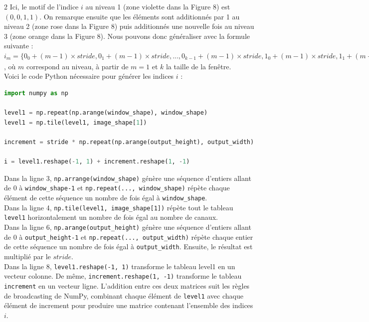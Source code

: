 \begin{multicols}{2}
Ici, le motif de l’indice $i$ au niveau 1 (zone violette dans la Figure 8) est $ (0,0,1,1) $. 
On remarque ensuite que les éléments sont additionnés par 1 au niveau 2 (zone rose dans la Figure 8) 
puis additionnés une nouvelle fois au niveau 3 (zone orange dans la Figure 8). Nous pouvons donc généraliser 
avec la formule suivante : \\

$ i_{m} = \{0_{0}+(m-1)\times stride,0_{1}+(m-1)\times stride,...,0_{k-1}+(m-1)\times stride, 1_{0}+(m-1)\times stride,1_{1}+(m-1)\times stride,...,1_{k-1}+(m-1)\times stride, (k-1)_{0}+(m-1)\times stride, (k-1)_{1}+(m-1)\times stride,..., (k-1)_{k-1}+(m-1)\times stride \}$,
où $m$ correspond au niveau, à partir de $m=1$ et $k$ la taille de la fenêtre. \\

Voici le code Python nécessaire pour générer les indices $i$ : \\

\begin{lstlisting}[language=Python]
import numpy as np

level1 = np.repeat(np.arange(window_shape), window_shape)
level1 = np.tile(level1, image_shape[1])

increment = stride * np.repeat(np.arange(output_height), output_width)

i = level1.reshape(-1, 1) + increment.reshape(1, -1)
\end{lstlisting} 
\hfill\break

Dans la ligne 3, \texttt{np.arrange(window\_shape)} génère une séquence d'entiers allant 
de 0 à \texttt{window\_shape-1} et \texttt{np.repeat(..., window\_shape)}
répète chaque élément de cette séquence un nombre de fois égal à \texttt{window\_shape}. \\

Dans la ligne 4, \texttt{np.tile(level1, image\_shape[1])} répète tout le tableau 
\texttt{level1} horizontalement un nombre de fois égal au nombre de canaux. \\

Dans la ligne 6, \texttt{np.arange(output\_height)} génère une séquence d’entiers allant
de 0 à \texttt{output\_height-1} et \texttt{np.repeat(..., output\_width)} répète chaque entier
de cette séquence un nombre de fois égal à \texttt{output\_width}. Ensuite, le résultat
est multiplié par le $stride$. \\

Dans la ligne 8, \texttt{level1.reshape(-1, 1)} transforme le tableau level1 en un
vecteur colonne. De même, \texttt{increment.reshape(1, -1)} transforme le tableau \texttt{increment} en un vecteur 
ligne. L’addition entre ces deux matrices suit les règles de broadcasting de NumPy\cite{NumPyEfficiency}, 
combinant chaque élément de \texttt{level1} avec chaque élément de increment pour produire une matrice
contenant l'ensemble des indices $i$. \\


\end{multicols}
